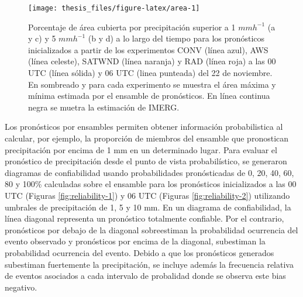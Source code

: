 \documentclass[12pt,oneside,a4paper]{reedthesis}
\begin{document}
\begin{figure}
\texttt{[image: thesis\_files/figure-latex/area-1]} \caption{Porcentaje de área cubierta por precipitación superior a 1 \(mmh^{-1}\) (a y c) y 5 \(mmh^{-1}\) (b y d) a lo largo del tiempo para los pronósticos inicializados a partir de los experimentos CONV (línea azul), AWS (línea celeste), SATWND (línea naranja) y RAD (línea roja) a las 00 UTC (línea sólida) y 06 UTC (linea punteada) del 22 de noviembre. En sombreado y para cada experimento se muestra el área máxima y mínima estimada por el ensamble de pronósticos. En línea continua negra se muetra la estimación de IMERG.}\label{fig:area}
\end{figure}
Los pronósticos por ensambles permiten obtener información probabilistica al calcular, por ejemplo, la proporción de miembros del ensamble que pronostican precipitación por encima de 1 mm en un determinado lugar. Para evaluar el pronóstico de precipitación desde el punto de vista probabilístico, se generaron diagramas de confiabilidad usando probabilidades pronósticadas de 0, 20, 40, 60, 80 y 100\% calculadas sobre el ensamble para los pronósticos inicializados a las 00 UTC (Figuras \ref{fig:reliability-1}) y 06 UTC (Figuras \ref{fig:reliability-2}) utilizando umbrales de precipitación de 1, 5 y 10 mm. En un diagrama de confiabilidad, la línea diagonal representa un pronóstico totalmente confiable. Por el contrario, pronósticos por debajo de la diagonal sobreestiman la probabilidad ocurrencia del evento observado y pronósticos por encima de la diagonal, subestiman la probabilidad ocurrencia del evento. Debido a que los pronósticos generados subestiman fuertemente la precipitación, se incluye además la frecuencia relativa de eventos asociados a cada intervalo de probalidad donde se observa este bias negativo.
\end{document}
